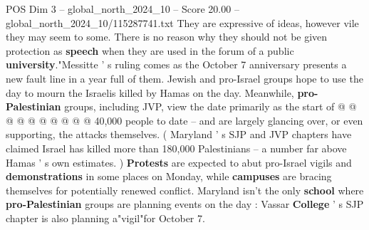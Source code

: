 \begin{textsample}{POS Dim 3 – global\_north\_2024\_10 – Score 20.00 – global\_north\_2024\_10/115287741.txt}
They are expressive of ideas, however vile they may seem to some.
There is no reason why they should not be given protection as \textbf{speech} when they are used in the forum of a public \textbf{university}."Messitte ' s ruling comes as the October 7 anniversary presents a new fault line in a year full of them.
Jewish and pro-Israel groups hope to use the day to mourn the Israelis killed by Hamas on the day.
Meanwhile, \textbf{pro-Palestinian} groups, including JVP, view the date primarily as the start of @ @ @ @ @ @ @ @ @ @ 40,000 people to date -- and are largely glancing over, or even supporting, the attacks themselves. ( Maryland ' s SJP and JVP chapters have claimed Israel has killed more than 180,000 Palestinians -- a number far above Hamas ' s own estimates. ) \textbf{Protests} are expected to abut pro-Israel vigils and \textbf{demonstrations} in some places on Monday, while \textbf{campuses} are bracing themselves for potentially renewed conflict.
Maryland isn't the only \textbf{school} where \textbf{pro-Palestinian} groups are planning events on the day : Vassar \textbf{College} ' s SJP chapter is also planning a"vigil"for October 7.

\end{textsample}
